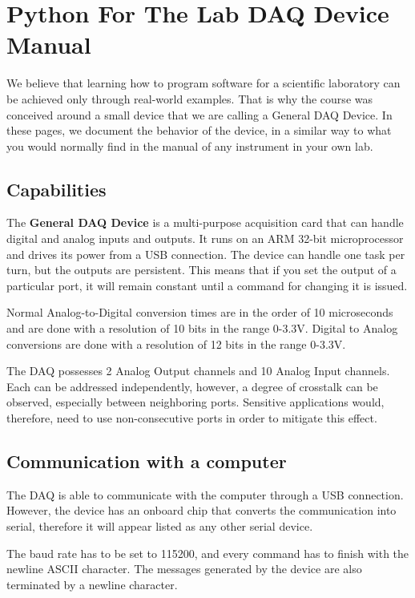 \chapter{Python For The Lab {DAQ} Device Manual}\label{python-for-the-lab-daq-devicemanual}
We believe that learning how to program software for a scientific
laboratory can be achieved only through real-world examples. That is why
the course was conceived around a small device that we are calling a
General {DAQ} Device. In these pages, we document the behavior of the
device, in a similar way to what you would normally find in the manual
of any instrument in your own lab.

\section{Capabilities}\label{capabilities}
The \textbf{General {DAQ} Device} is a multi-purpose acquisition card
that can handle digital and analog inputs and outputs. It runs on an
{ARM} 32-bit microprocessor and drives its power from a {USB}
connection. The device can handle one task per turn, but the outputs are
persistent. This means that if you set the output of a particular port,
it will remain constant until a command for changing it is issued.

Normal Analog-to-Digital conversion times are in the order of 10
microseconds and are done with a resolution of 10 bits in the range
0-3.3V. Digital to Analog conversions are done with a resolution of 12
bits in the range 0-3.3V.

The {DAQ} possesses 2 Analog Output channels and 10 Analog Input
channels. Each can be addressed independently, however, a degree of
crosstalk can be observed, especially between neighboring ports.
Sensitive applications would, therefore, need to use non-consecutive
ports in order to mitigate this effect.

\section{Communication with a computer}\label{communication-with-acomputer}
The {DAQ} is able to communicate with the computer through a {USB}
connection. However, the device has an onboard chip that converts the
communication into serial, therefore it will appear listed as any other
serial device.

The baud rate has to be set to 115200, and every command has to finish
with the newline {ASCII} character. The messages generated by the device
are also terminated by a newline character.

